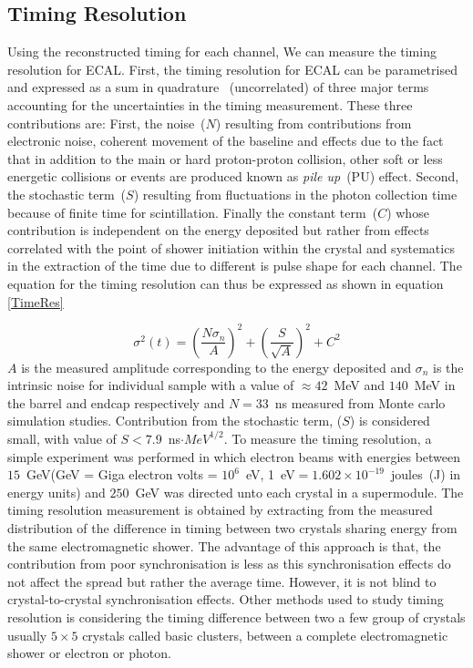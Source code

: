\subsection{Timing Resolution}
Using the reconstructed timing for each channel, We can measure the timing resolution for ECAL.
First, the timing resolution for ECAL can be parametrised and expressed as a sum in quadrature ~(uncorrelated) of three major terms accounting for the uncertainties in the timing measurement. These three contributions are: First, the noise~($N$) resulting from contributions from electronic noise, coherent movement of the baseline and effects due to the fact that in addition to the main or hard proton-proton collision, other soft or less energetic collisions or events are produced known as \textit{pile up}~(PU) effect. Second, the stochastic term~($S$) resulting from fluctuations in the photon collection time because of finite time for \pb scintillation. Finally the constant term~($C$) whose contribution is independent on the energy deposited but rather from effects correlated with the point of shower initiation within the crystal and systematics in the extraction of the time due to different is pulse shape for each channel.
The equation for the timing resolution can thus be expressed as shown in equation \eqref{TimeRes}

\begin{equation}\label{TimeRes}
\sigma^{2}(t) = \left(\frac{N\sigma_{n}}{A}\right)^{2} + \left(\frac{S}{\sqrt{A}}\right)^{2} + C^{2}
\end{equation}
$A$ is the measured amplitude corresponding to the energy deposited and $\sigma_{n}$ is the intrinsic noise for individual sample with a value of $\approx 42$~MeV and $140$~MeV in the barrel and endcap respectively and $N = 33$~ns measured from Monte carlo simulation studies. Contribution from the stochastic term, ($S$) is considered small, with value of $S < 7.9$~ns$\cdot MeV^{1/2}$.
\newline
To measure the timing resolution, a simple experiment was performed in which electron beams with energies between $15$~GeV(GeV = Giga electron volts = $10^{6}$~eV, 1~eV$ = 1.602 \times 10^{-19}$~joules~(J) in energy units) and $250$~GeV was directed unto each crystal in a supermodule. The timing resolution measurement is obtained by extracting from the measured distribution of the difference in timing between two crystals sharing energy from the same electromagnetic shower. The advantage of this approach is that, the contribution from poor synchronisation is less as this synchronisation effects do not affect the spread but rather the average time. However, it is not blind to crystal-to-crystal synchronisation effects.
Other methods used to study timing resolution is considering the timing difference between two a few group of crystals usually $5\times5$  crystals called basic clusters, between a complete electromagnetic shower or electron or photon.

